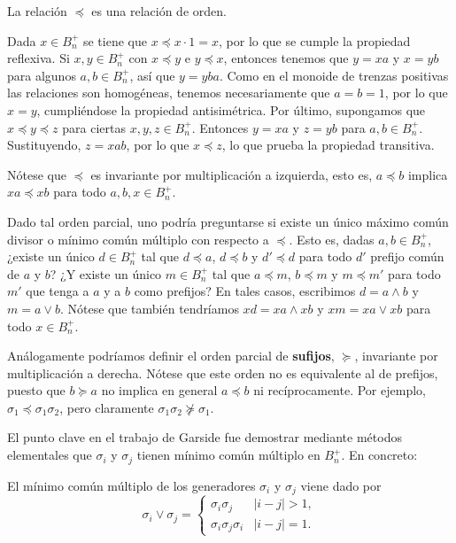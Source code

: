 \documentclass[bibtex, anon]{TEMat-article}
\begin{document}
\begin{lema}
	La relación $\preccurlyeq$ es una relación de orden.
\end{lema}
\begin{demostracion}
	Dada $x\in B_n^+$ se tiene que $x\preccurlyeq x\cdot 1=x$, por lo que se cumple la propiedad reflexiva. Si $x,y\in B_n^+$ con $x \preccurlyeq y $ e $y \preccurlyeq x$, entonces tenemos que $y=xa$ y $x=yb$ para algunos $a,b\in B_n^+$, así que $y=yba$. Como en el monoide de trenzas positivas las relaciones son homogéneas, tenemos necesariamente que $a=b=1$, por lo que $x=y$, cumpliéndose la propiedad antisimétrica. Por último, supongamos que $x\preccurlyeq y\preccurlyeq z$ para ciertas $x,y,z\in B_n^+$. Entonces $y=xa$ y $z=yb$ para $a,b\in B_n^+$. Sustituyendo, $z=xab$, por lo que $x\preccurlyeq z$, lo que prueba la propiedad transitiva. 
\end{demostracion}
Nótese que $\preccurlyeq$ es invariante por multiplicación a izquierda, esto es, $a\preccurlyeq b$ implica $xa\preccurlyeq xb$ para todo $a,b,x\in B_n^+$. %

Dado tal orden parcial, uno podría preguntarse si existe un único máximo común divisor o mínimo común múltiplo con respecto a $\preccurlyeq$. Esto es, dadas $a,b\in B_n^+$, ¿existe un único $d\in B_n^+$ tal que $d\preccurlyeq a$, $d\preccurlyeq b$ y $d'\preccurlyeq d$ para todo $d'$ prefijo común de $a$ y $b$? ¿Y existe un único $m\in B_n^+$ tal que $a\preccurlyeq m$, $b\preccurlyeq m$ y $m\preccurlyeq m'$ para todo $m'$ que tenga a $a$ y a $b$ como prefijos? En tales casos, escribimos $d=a\land b$ y $m=a\lor b$. Nótese que también tendríamos $xd=xa\land xb$ y $xm=xa\lor xb$ para todo $x\in B_n^+$.

\begin{nota}
	Análogamente podríamos definir el orden parcial de \textbf{sufijos}, $\succcurlyeq$, invariante por multiplicación a derecha. Nótese que este orden no es equivalente al de prefijos, puesto que $b\succcurlyeq a$ no implica en general $a\preccurlyeq b$ ni recíprocamente. Por ejemplo, $\sigma_1\preccurlyeq \sigma_1\sigma_2$, pero claramente $\sigma_1\sigma_2\not\succcurlyeq \sigma_1$.
\end{nota}

El punto clave en el trabajo de Garside fue demostrar mediante métodos elementales que $\sigma_i$ y $\sigma_j$ tienen mínimo común múltiplo en $B_n^+$. En concreto:
\begin{proposicion}\cite[Teorema 1.2]{Garside}
	El mínimo común múltiplo de los generadores $\sigma_i$ y $\sigma_j$ viene dado por
	$$\sigma_i\lor\sigma_j=\begin{cases}
	\sigma_i\sigma_j & |i-j|>1,\\
	\sigma_i\sigma_j\sigma_i & |i-j|=1.
	\end{cases}$$
\end{proposicion}
\end{document}
